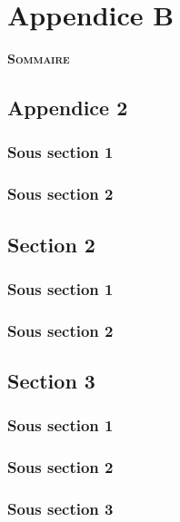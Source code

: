 
\chapter{Appendice B}

\vspace{10pt}
\begin{center} {\scshape\bfseries Sommaire} \end{center}

\startcontents[chapter]

\smash{\rule{\textwidth}{.4pt}}
\smash{\rule{\textwidth}{.4pt}}


\vspace{20pt}


\section{Appendice 2}

\subsection{Sous section 1}
\subsection{Sous section 2}

\section{Section 2}

\subsection{Sous section 1}
\subsection{Sous section 2}

\section{Section 3}

\subsection{Sous section 1}
\subsection{Sous section 2}
\subsection{Sous section 3}


\stopcontents[chapter]
